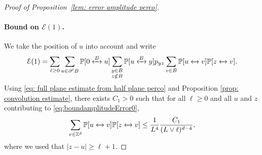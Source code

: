 \documentclass[11pt,a4paper]{article}
\numberwithin{equation}{section}
\theoremstyle{plain}
\theoremstyle{definition}
\newcommand{\connect}{\xleftrightarrow}
\begin{document}
\begin{proof}[Proof of Proposition~\textup{\ref{lem: error amplitude perco}}]


\paragraph{Bound on $\mathcal E(1)$.} We take the position of $u$ into account and write
\begin{equation}\label{eq:boundamplitudeError0}
\mathcal E(1)=
 \sum_{\ell\geq 0}\sum_{u\in \partial^\ell B}\mathbb P[0\connect{B\:}u]
\sum_{\substack{y\in B\\ z\notin B}}\mathbb P[u\connect{B\:}y] p_{yz}\sum_{v\in B}\mathbb P[u\connect{\:}v]\mathbb P[z\connect{}v].
\end{equation}
Using \eqref{eq: full plane estimate from half plane perco} and Proposition \ref{prop: convolution estimate}, there exists $C_1>0$ such that for all $\ell\ge0$ and all $u$ and $z$ contributing to \eqref{eq:boundamplitudeError0},
\begin{equation}\label{eq:boundamplitudeError1}
	\sum_{v\in \mathbb Z^d}\mathbb P[u\connect{}v]\mathbb P[z\connect{}v]\leq \frac{1}{L^4}\frac{C_1}{(L\vee\ell)^{d-4}},
\end{equation}
where we used that $|z-u|\geq \ell+1$.


\end{proof}
\end{document}
